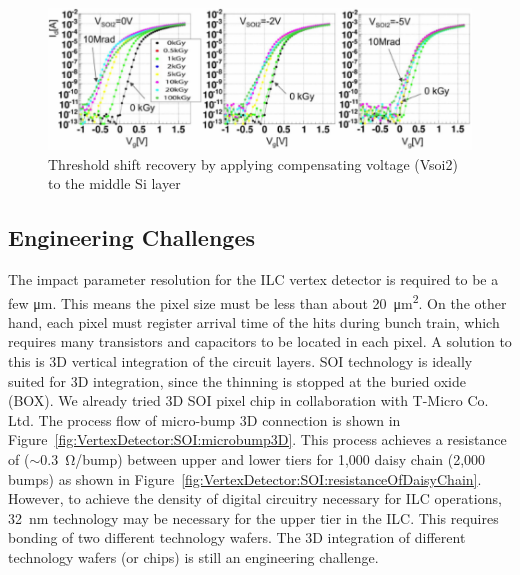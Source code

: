 \begin{figure}
	\centering
	\includegraphics[width=.9\textwidth]{VertexDetector/SOI/thresholdShift}
	\caption{Threshold shift recovery by applying compensating voltage (Vsoi2) to the middle Si layer}
	\label{fig:VertexDetector:SOI:thresholdShift}
\end{figure}

\subsection{Engineering Challenges}
The impact parameter resolution for the ILC vertex detector is required to be a few \si{\micro\meter}. This means the pixel size must be less than about \SI{20}{\micro\meter\squared}. On the other hand, each pixel must register arrival time of the hits during bunch train, which requires many transistors and capacitors to be located in each pixel.
A solution to this is 3D vertical integration of the circuit layers. SOI technology is ideally suited for 3D integration, since the thinning is stopped at the buried oxide (BOX). We already tried 3D SOI pixel chip in collaboration with T-Micro Co. Ltd. The process flow of micro-bump 3D connection is shown in Figure~\ref{fig:VertexDetector:SOI:microbump3D}. This process achieves a resistance of ($\sim$\SI{0.3}{\ohm}/bump) between upper and lower tiers for 1,000 daisy chain (2,000 bumps) as shown in Figure~\ref{fig:VertexDetector:SOI:resistanceOfDaisyChain}.
However, to achieve the density of digital circuitry necessary for ILC operations, \SI{32}{nm} technology may be necessary for the upper tier in the ILC. This requires bonding of two different technology wafers. The 3D integration of different technology wafers (or chips) is still an engineering challenge.

